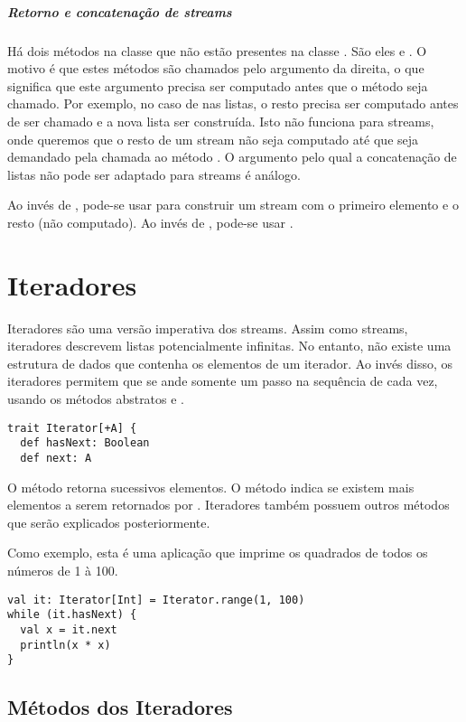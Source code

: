 \paragraph{Retorno e concatenação de streams} Há dois métodos na classe 
que não estão presentes na classe . São eles \code{::} e
\code{:::}.  O motivo é que estes métodos são chamados pelo argumento da direita, o
que significa que este argumento precisa ser computado antes que o método seja chamado.
Por exemplo, no caso de  nas listas, o resto  precisa ser computado
antes de \code{::} ser chamado e a nova lista ser construída.
Isto não funciona para streams, onde queremos que o resto de um stream 
não seja computado até que seja demandado pela chamada ao método .
O argumento pelo qual a concatenação de listas \code{:::} não pode ser adaptado para streams
é análogo.

Ao inv\'{e}s de , pode-se usar  para
construir um stream com o primeiro elemento  e o resto (n\~{a}o computado).
Ao invés de , pode-se usar .  


\chapter{Iteradores}

Iteradores s\~{a}o uma vers\~{a}o imperativa dos streams. Assim como streams,
iteradores descrevem listas potencialmente infinitas. No entanto, não existe uma estrutura de dados
que contenha os elementos de um iterador. Ao invés disso, os iteradores permitem que se ande somente um passo
na sequ\^{e}ncia de cada vez, usando os métodos abstratos  e .
\begin{lstlisting}
trait Iterator[+A] {
  def hasNext: Boolean
  def next: A
\end{lstlisting}
O método  retorna sucessivos elementos.  O método 
indica se existem mais elementos a serem retornados por
. Iteradores também possuem outros métodos que serão explicados posteriormente.

Como exemplo, esta é uma aplicação que imprime os quadrados de todos os números de 1 à 100.
\begin{lstlisting}
val it: Iterator[Int] = Iterator.range(1, 100)
while (it.hasNext) {
  val x = it.next
  println(x * x)
}
\end{lstlisting}

\section{Métodos dos Iteradores}

